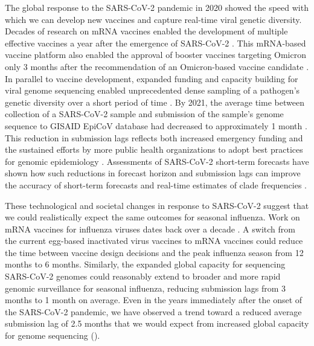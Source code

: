 \documentclass[9pt,lineno]{elife}
\begin{document}
The global response to the SARS-CoV-2 pandemic in 2020 showed the speed with which we can develop new vaccines and capture real-time viral genetic diversity.
Decades of research on mRNA vaccines enabled the development of multiple effective vaccines a year after the emergence of SARS-CoV-2 \citep{Mulligan2020,Baden2021}.
This mRNA-based vaccine platform also enabled the approval of booster vaccines targeting Omicron only 3 months after the recommendation of an Omicron-based vaccine candidate \citep{Grant2023}.
In parallel to vaccine development, expanded funding and capacity building for viral genome sequencing enabled unprecedented dense sampling of a pathogen's genetic diversity over a short period of time \citep{Chen2022}.
By 2021, the average time between collection of a SARS-CoV-2 sample and submission of the sample's genome sequence to GISAID EpiCoV database had decreased to approximately 1 month \citep{Brito2022}.
This reduction in submission lags reflects both increased emergency funding and the sustained efforts by more public health organizations to adopt best practices for genomic epidemiology \citep{Kalia2021,Black2020}.
Assessments of SARS-CoV-2 short-term forecasts have shown how such reductions in forecast horizon and submission lags can improve the accuracy of short-term forecasts and real-time estimates of clade frequencies \citep{Abousamra2023}.

These technological and societal changes in response to SARS-CoV-2 suggest that we could realistically expect the same outcomes for seasonal influenza.
Work on mRNA vaccines for influenza viruses dates back over a decade \citep{Petsch2012,Brazzoli2016,Pardi2018,Feldman2019}.
A switch from the current egg-based inactivated virus vaccines to mRNA vaccines could reduce the time between vaccine design decisions and the peak influenza season from 12 months to 6 months.
Similarly, the expanded global capacity for sequencing SARS-CoV-2 genomes could reasonably extend to broader and more rapid genomic surveillance for seasonal influenza, reducing submission lags from 3 months to 1 month on average.
Even in the years immediately after the onset of the SARS-CoV-2 pandemic, we have observed a trend toward a reduced average submission lag of 2.5 months that we would expect from increased global capacity for genome sequencing ().
\end{document}
